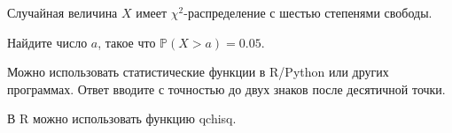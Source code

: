
\begin{question}
Случайная величина \(X\) имеет \(\chi^2\)-распределение с шестью степенями свободы.

Найдите число \(a\), такое что \(\mathbb{P}(X > a) = 0.05\).

Можно использовать статистические функции в R/Python или других программах.
Ответ вводите с точностью до двух знаков после десятичной точки.
\end{question}

\begin{solution}
В R можно использовать функцию qchisq.
\end{solution}

